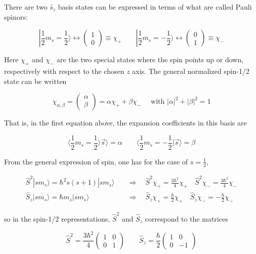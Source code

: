 There are two $\hat{s}_z$ basis states can be expressed in terms of what are
called Pauli spinors: 

\[
|\frac{1}{2}m_s = \frac{1}{2}\rangle \leftrightarrow \begin{pmatrix}
  1 \\ 0
\end{pmatrix} \equiv \chi_+ \qquad | \frac{1}{2} m_s = -\frac{1}{2}\rangle
\leftrightarrow \begin{pmatrix}
  0 \\ 1
\end{pmatrix} \equiv \chi_-
\] \vspace{3px}


Here $\chi_+$ and $\chi_-$ are the two special states where the spin points up
or down, respectively with respect to the chosen $z$ axis. The general
normalized spin-1/2 state can be written 

\[
  \chi_{\alpha, \beta} = \begin{pmatrix}
    \alpha \\ \beta
  \end{pmatrix} = \alpha\chi_+ + \beta\chi_- \quad \text{ with } |\alpha|^2
  + |\beta|^2 = 1
\] \vspace{3px}

That is, in the first equation above, the expansion coefficients in this basis
are 

\[
\langle \frac{1}{2} m_s = \frac{1}{2} \rangle \vec{s} \rangle = \alpha \qquad
\langle \frac{1}{2} m_s = -\frac{1}{2} | \vec{s} \rangle = \beta
\] \vspace{3px}

From the general expression of spin, one has for the case of $s=\frac{1}{2}$, 

\begin{align} \label{}
  \hat{S}^2 |s m_s \rangle = \hbar^2 s(s+1)|s m_s \rangle \quad &\Rightarrow
  \quad \hat{S}^2 \chi_+ = \frac{3\hbar^2}{4}\chi_+ \quad \hat{S}^2 \chi_-
  = \frac{3\hbar^2}{4}\chi_- \\ 
  \hat{S}_z|s m_s \rangle = \hbar m_s | s m_s \rangle \quad &\Rightarrow \quad
  \hat{S}_z \chi_+ = \frac{\hbar}{2}\chi_+ \quad \hat{S}_z \chi_-
  = -\frac{\hbar}{2}\chi_-
\end{align}\vspace{3px}

so in the spin-1/2 representations,  $\hat{S}^2$ and $\hat{S}_z$ correspond to
the matrices 

\[
\hat{S}^2 = \frac{3\hbar^2}{4} \begin{pmatrix}
  1 & 0 \\ 0 & 1 
\end{pmatrix} \qquad \hat{S}_z = \frac{\hbar}{2} \begin{pmatrix}
  1 & 0 \\ 0 & -1 
\end{pmatrix} 
\] \vspace{3px}


